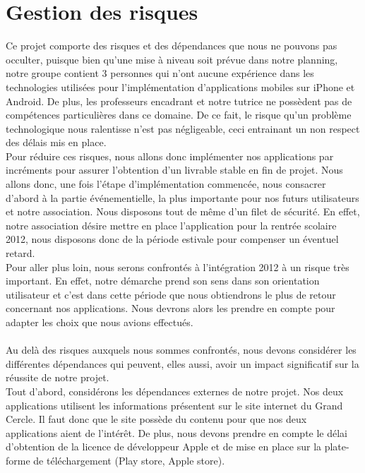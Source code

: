 \documentclass[a4paper,11pt]{article}
\begin{document}
\section{\bf{Gestion des risques}}
\indent \indent Ce projet comporte des risques et des dépendances que nous ne pouvons pas occulter, puisque bien qu’une mise à niveau soit prévue dans notre planning, notre groupe contient 3 personnes qui n’ont aucune expérience dans les technologies utilisées pour l’implémentation d’applications mobiles sur iPhone et Android. De plus, les professeurs encadrant et notre tutrice ne possèdent pas de compétences particulières dans ce domaine. De ce fait, le risque qu’un problème technologique nous ralentisse n'est pas négligeable, ceci entrainant un non respect des délais mis en place.\\
\indent Pour réduire ces risques, nous allons donc implémenter nos applications par incréments pour assurer l’obtention d’un livrable stable en fin de projet. Nous allons donc, une fois l’étape d’implémentation commencée, nous consacrer d’abord à la partie événementielle, la plus importante pour nos futurs utilisateurs et notre association. Nous disposons tout de même d’un filet de sécurité. En effet, notre association désire mettre en place l’application pour la rentrée scolaire 2012, nous disposons donc de la période estivale pour compenser un éventuel retard.\\
\indent Pour aller plus loin, nous serons confrontés à l’intégration 2012 à un risque très important. En effet, notre démarche prend son sens dans son orientation utilisateur et c’est dans cette période que nous obtiendrons le plus de retour concernant nos applications. Nous devrons alors les prendre en compte pour adapter les choix que nous avions effectués.\\
\\
\indent Au delà des risques auxquels nous sommes confrontés, nous devons considérer les différentes dépendances qui peuvent, elles aussi, avoir un impact significatif sur la réussite de notre projet.\\
\indent Tout d’abord, considérons les dépendances externes de notre projet. Nos deux applications utilisent les informations présentent sur le site internet du Grand Cercle. Il faut donc que le site possède du contenu pour que nos deux applications aient de l’intérêt. De plus, nous devons prendre en compte le délai d’obtention de la licence de développeur Apple et de mise en place sur la plate-forme de téléchargement (Play store, Apple store).\\
\end{document}
